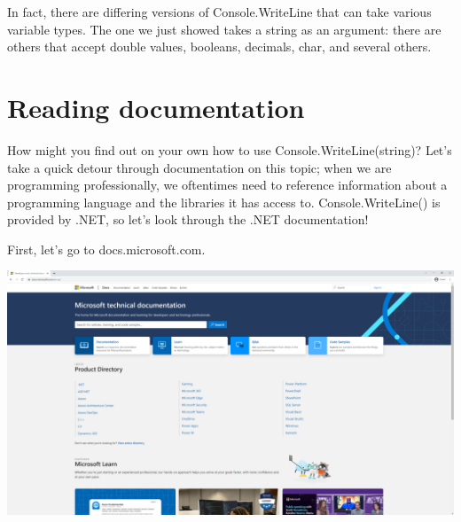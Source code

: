 \documentclass[oneside, openany] {book}
\begin{document}
In fact, there are differing versions of Console.WriteLine that can take various variable types. The one we just showed takes a string as an argument: there are others that accept double values, booleans, decimals, char, and several others.
\section{Reading documentation}
How might you find out on your own how to use Console.WriteLine(string)? Let's take a quick detour through documentation on this topic; when we are programming professionally, we oftentimes need to reference information about a programming language and the libraries it has access to. Console.WriteLine() is provided by .NET, so let's look through the .NET documentation!

First, let's go to docs.microsoft.com.

\includegraphics[scale = 0.2]{MicrosoftDocs1}
\end{document}
